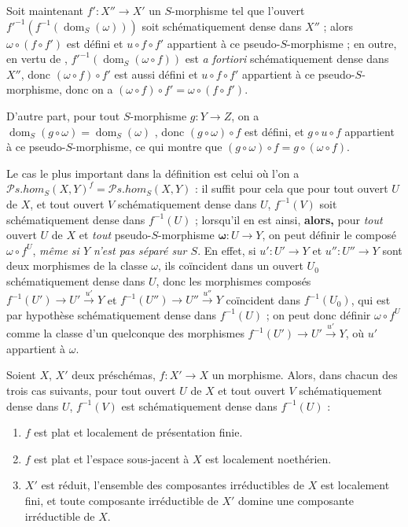 \begin{env}[20.3.3]
\label{IV.20.3.3}
Soit maintenant $f':X''\to X'$ un $S$-morphisme tel que l'ouvert $f'^{-1}(f^{-1}(\operatorname{dom}_S(\omega)))$ soit schématiquement dense dans $X''$ ; alors $\omega\circ(f\circ f')$ est défini et $u\circ f\circ f'$ appartient à ce pseudo-$S$-morphisme ; en outre, en vertu de , $f'^{-1}(\operatorname{dom}_S(\omega\circ f))$ est \emph{a fortiori} schématiquement dense dans $X''$, donc $(\omega\circ f)\circ f'$ est aussi défini et $u\circ f\circ f'$ appartient à ce pseudo-$S$-morphisme, donc on a $(\omega\circ f)\circ f'=\omega\circ(f\circ f')$.

D'autre part, pour tout $S$-morphisme $g:Y\to Z$, on a $\operatorname{dom}_S(g\circ\omega)=\operatorname{dom}_S(\omega)$ , donc $(g\circ\omega)\circ f$ est défini, et $g\circ u\circ f$ appartient à ce pseudo-$S$-morphisme, ce qui montre que $(g\circ\omega)\circ f=g\circ(\omega\circ f)$.
\end{env}

\begin{env}[20.3.4]
\label{IV.20.3.4}
Le cas le plus important dans la définition  est celui où l'on a $\mathscr{P}\!s.\mathit{hom}_S(X,Y)^f=\mathscr{P}\!s.\mathit{hom}_S(X,Y)$ : il suffit pour cela que pour tout ouvert $U$ de $X$, et tout ouvert $V$ schématiquement dense dans $U$, $f^{-1}(V)$ soit schématiquement dense dans $f^{-1}(U)$ ; lorsqu'il en est ainsi, \textbf{alors,} pour \emph{tout} ouvert $U$ de $X$ et \emph{tout} pseudo-$S$-morphisme $\boldsymbol{\omega}:U\to Y$, on peut définir le composé $\omega\circ f^U$, \emph{même si $Y$ n'est pas séparé sur $S$}.
En effet, si $u':U'\to Y$ et $u'':U''\to Y$ sont deux morphismes de la classe $\omega$, ils coïncident dans un ouvert $U_0$ schématiquement dense dans $U$, donc les morphismes composés $f^{-1}(U')\to U'\xrightarrow{u'}Y$ et $f^{-1}(U'')\to U''\xrightarrow{u''}Y$ coïncident dans $f^{-1}(U_0)$, qui est par hypothèse schématiquement dense dans $f^{-1}(U)$ ; on peut donc définir $\omega\circ f^U$ comme la classe d'un quelconque des morphismes $f^{-1}(U')\to U'\xrightarrow{u'}Y$, où $u'$ appartient à $\omega$.
\end{env}

\begin{proposition}[20.3.5]
Soient $X$, $X'$ deux préschémas, $f:X'\to X$ un morphisme.
Alors, dans chacun des trois cas suivants, pour tout ouvert $U$ de $X$ et tout ouvert $V$ schématiquement dense dans $U$, $f^{-1}(V)$ est schématiquement dense dans $f^{-1}(U)$ :
\begin{enumerate}[label=\emph{(\roman*)}]
  \item $f$ est plat et localement de présentation finie.
  \item $f$ est plat et l'espace sous-jacent à $X$ est localement noethérien.
  \item $X'$ est réduit, l'ensemble des composantes irréductibles de $X$ est localement fini, et toute composante irréductible de $X'$ domine une composante irréductible de $X$.
\end{enumerate}
\end{proposition}

